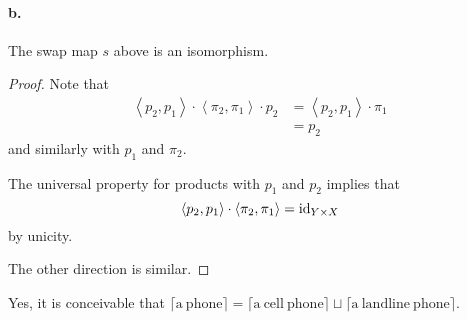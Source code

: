 \paragraph{b.}
\begin{thm}
  The swap map $s$ above is an isomorphism.
\end{thm}
\begin{proof}
  Note that
  \begin{align*}
    \left\langle p_2 , p_1 \right\rangle \cdot
    \left\langle \pi_2 , \pi_1 \right\rangle \cdot
    p_2
    &= \left\langle p_2 , p_1 \right\rangle \cdot
      \pi_1 \\
    &= p_2
  \end{align*}
  and similarly with $p_1$ and $\pi_2$.

  The universal property for products with
  $p_1$ and $p_2$ implies that
  \begin{equation*}
    \left\langle p_2 , p_1 \right\rangle \cdot
    \left\langle \pi_2 , \pi_1 \right\rangle =
    \mathrm{id}_{Y \times X}
  \end{equation*}
  by unicity.

  The other direction is similar.
\end{proof}


Yes, it is conceivable that
$\lceil\mathrm{a\ phone}\rceil =
\lceil\mathrm{a\ cell\ phone}\rceil \sqcup
\lceil\mathrm{a\ landline\ phone}\rceil$.


